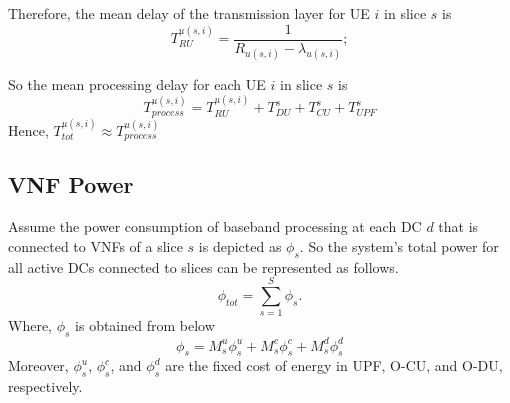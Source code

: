 \documentclass[conference]{IEEEtran}
\begin{document}
Therefore, the mean delay of the transmission layer for UE $i$ in slice $s$ is
\begin{equation}
 T_{RU}^{u(s,i)} = \frac{1}{R_{u(s,i)} - \lambda_{u(s,i)}};
\end{equation}

So the mean processing delay for each UE $i$ in slice $s$ is 
\begin{equation}
T_{process}^{u(s,i)} =  T_{RU}^{u(s,i)} + T_{DU}^{s} + T_{CU}^{s} + T_{UPF}^{s}
\end{equation}
Hence, $T_{tot}^{u(s,i)} \approx T_{process}^{u(s,i)} $
\subsection{VNF Power}
Assume the power consumption of baseband processing at each DC $d$ that is connected to VNFs of a slice $s$ is depicted as
$\phi_{s}$. So the system's total power for all active DCs connected to slices can be represented as follows.
\begin{equation*}
\textstyle \phi_{tot} = \sum_{s=1}^{S}\phi_{s}.
\end{equation*}
Where, $\phi_{s}$ is obtained from below
\begin{equation}
\phi_{s} = M_s^u \phi_s^u + M_s^c \phi_s^c+ M_s^d \phi_s^d
\end{equation}
Moreover, $\phi_s^u$, $\phi_s^c$, and $\phi_s^d$ are the fixed cost of energy in UPF, O-CU, and O-DU, respectively. 
\end{document}
